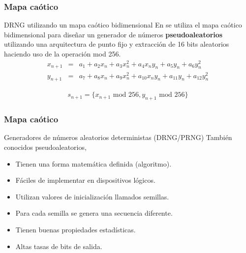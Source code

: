 \documentclass[10pt]{beamer}
\begin{document}
\begin{frame}
    \frametitle{Mapa caótico}
    \begin{block}{DRNG utilizando un mapa caótico bidimensional}
        \justifying
        En \cite{Fraga2021} se utiliza el mapa caótico bidimensional para diseñar un generador de números \textbf{pseudoaleatorios} utilizando una arquitectura de punto fijo y extracción de 16 bits aleatorios haciendo uso de la operación mod 256.
        \begin{equation*}
            \begin{array}{ccl}
                x_{n+1} & = &  a_{1} + a_{2}x_{n} + a_{3}x_{n}^{2} + a_{4}x_{n}y_{n} + a_{5}y_{n} + a_{6}y_{n}^{2}\\
                y_{n+1} & = &  a_{7} + a_{8}x_{n} + a_{9}x_{n}^{2} + a_{10}x_{n}y_{n} + a_{11}y_{n} + a_{12}y_{n}^{2}
            \end{array}
	    \end{equation*}
	    
	    \begin{equation}
            \begin{array}{lcl}
                s_{n+1} = \{ x_{n+1} \text{ mod } 256, y_{n+1} \text{ mod } 256 \}
            \end{array}
            \label{eq:extraccion}
        \end{equation}
	\end{block}
\end{frame}


\begin{frame}
    \frametitle{Mapa caótico}
    \begin{block}{Generadores de números aleatorios deterministas (DRNG/PRNG) }
        \justifying
        También conocidos pseudoaleatorios,
        \begin{itemize}
            \item Tienen una forma matemática definida (algoritmo).
            \item Fáciles de implementar en dispositivos lógicos.
            \item Utilizan valores de inicialización llamados semillas.
            \item Para cada semilla se genera una secuencia diferente.
            \item Tienen buenas propiedades estadísticas.
            \item Altas tasas de bits de salida.
        \end{itemize}
	\end{block}
\end{frame}
\end{document}
